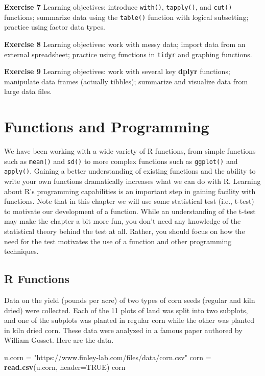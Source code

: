\documentclass[
]{krantz}
\newenvironment{Shaded}{\begin{snugshade}}{\end{snugshade}}
\newcommand{\DataTypeTok}[1]{\textcolor[rgb]{0.13,0.29,0.53}{#1}}
\newcommand{\KeywordTok}[1]{\textcolor[rgb]{0.13,0.29,0.53}{\textbf{#1}}}
\newcommand{\NormalTok}[1]{#1}
\newcommand{\OtherTok}[1]{\textcolor[rgb]{0.56,0.35,0.01}{#1}}
\newcommand{\StringTok}[1]{\textcolor[rgb]{0.31,0.60,0.02}{#1}}
\begin{document}
\textbf{Exercise 7} Learning objectives: introduce \texttt{with()}, \texttt{tapply()}, and \texttt{cut()} functions; summarize data using the \texttt{table()} function with logical subsetting; practice using factor data types.

\textbf{Exercise 8} Learning objectives: work with messy data; import data from an external spreadsheet; practice using functions in \texttt{tidyr} and graphing functions.

\textbf{Exercise 9} Learning objectives: work with several key \textbf{dplyr} functions; manipulate data frames (actually tibbles); summarize and visualize data from large data files.

\hypertarget{functions}{%
\chapter{Functions and Programming}\label{functions}}

We have been working with a wide variety of R functions, from simple functions such as \texttt{mean()} and \texttt{sd()} to more complex functions such as \texttt{ggplot()} and \texttt{apply()}. Gaining a better understanding of existing functions and the ability to write your own functions dramatically increases what we can do with R. Learning about R's programming capabilities is an important step in gaining facility with functions. Note that in this chapter we will use some statistical test (i.e., t-test) to motivate our development of a function. While an understanding of the t-test may make the chapter a bit more fun, you don't need any knowledge of the statistical theory behind the test at all. Rather, you should focus on how the need for the test motivates the use of a function and other programming techniques.

\hypertarget{r-functions}{%
\section{R Functions}\label{r-functions}}

Data on the yield (pounds per acre) of two types of corn seeds (regular and kiln dried) were collected. Each of the 11 plots of land was split into two subplots, and one of the subplots was planted in regular corn while the other was planted in kiln dried corn. These data were analyzed in a famous paper authored by William Gosset. Here are the data.

\begin{Shaded}
\begin{Highlighting}[]
\NormalTok{u.corn =}\StringTok{ "https://www.finley{-}lab.com/files/data/corn.csv"}
\NormalTok{corn =}\StringTok{ }\KeywordTok{read.csv}\NormalTok{(u.corn, }\DataTypeTok{header=}\OtherTok{TRUE}\NormalTok{)}
\NormalTok{corn}
\end{Highlighting}
\end{Shaded}
\end{document}
